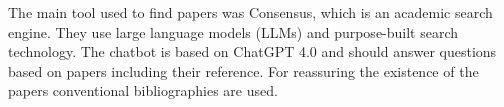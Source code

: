 The main tool used to find papers was Consensus, which is an academic search engine. They use large language models (LLMs) and purpose-built search technology. The chatbot is based on ChatGPT 4.0 and should answer questions based on papers including their reference. For reassuring the existence of the papers conventional bibliographies are used.
